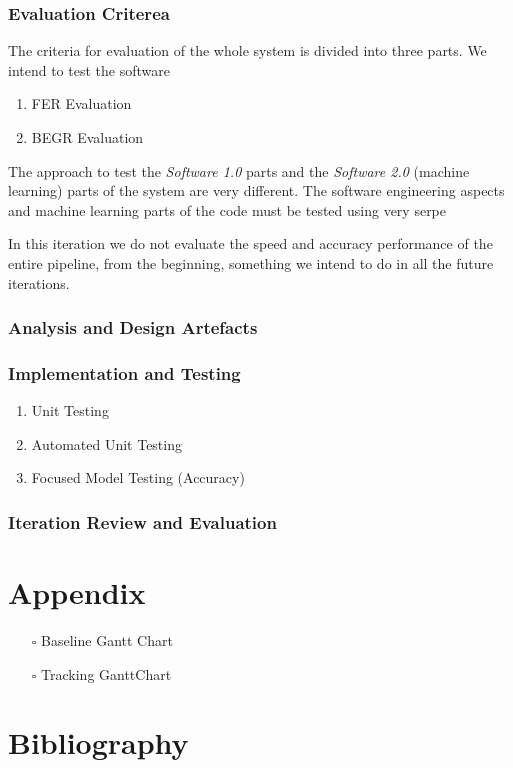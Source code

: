 \documentclass[12pt,a4paper,man]{report}
\begin{document}
\section{Evaluation Criterea}
\label{sec:org6f87987}

The criteria for evaluation of the whole system is divided into three parts. We intend to test the software 
\begin{enumerate}
\item FER Evaluation
\item BEGR Evaluation
\end{enumerate}

The approach to test the \emph{Software 1.0} parts and the \emph{Software 2.0} (machine learning) parts of the system are very different.
The software engineering aspects and machine learning parts of the code must be tested using very serpe

In this iteration we do not evaluate the speed and accuracy performance of the entire pipeline, from the beginning, something we intend to do in all the future iterations.


\section{Analysis and Design Artefacts}
\label{sec:orgfa87573}
\section{Implementation and Testing}
\label{sec:orga0c84a8}

\begin{enumerate}
\item Unit Testing
\label{sec:org7b48fff}

\item Automated Unit Testing
\label{sec:orgd19451f}

\item Focused Model Testing (Accuracy)
\label{sec:orgd854210}
\end{enumerate}

\section{Iteration Review and Evaluation}
\label{sec:orgfc1ea1b}

\part{Appendix}
\label{sec:orgf301c02}
\begin{itemize}
\item[{$\square$}] Baseline Gantt Chart
\item[{$\square$}] Tracking GanttChart
\end{itemize}
\part{Bibliography}
\label{sec:orgc4da93d}

\printglossaries



\end{document}
